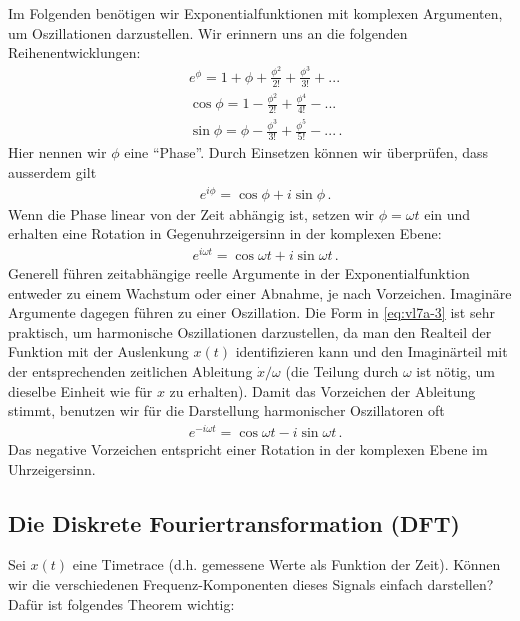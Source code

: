 Im Folgenden benötigen wir Exponentialfunktionen mit komplexen Argumenten, um Oszillationen darzustellen. Wir erinnern uns an die folgenden Reihenentwicklungen:
\begin{align}
&e^{\phi} = 1 + \phi + \frac{\phi^2}{2!} + \frac{\phi^3}{3!} + ... \nonumber\\
&\cos{\phi} = 1 - \frac{\phi^2}{2!} + \frac{\phi^4}{4!} - ...\nonumber\\
&\sin{\phi} = \phi - \frac{\phi^3}{3!} + \frac{\phi^5}{5!} - ...\,.
\label{eq:vl7a-1}
\end{align}
Hier nennen wir $\phi$ eine ``Phase''. Durch Einsetzen können wir überprüfen, dass ausserdem gilt
\begin{align}
&e^{i\phi} = \cos{\phi} +i\sin{\phi}\,.
\label{eq:vl7a-2}
\end{align}
Wenn die Phase linear von der Zeit abhängig ist, setzen wir $\phi = \omega t$ ein und erhalten eine Rotation in Gegenuhrzeigersinn in der komplexen Ebene:
\begin{align}
&e^{i\omega t} = \cos{\omega t} +i\sin{\omega t}\,.
\label{eq:vl7a-3}
\end{align}
Generell führen zeitabhängige reelle Argumente in der Exponentialfunktion entweder zu einem Wachstum oder einer Abnahme, je nach Vorzeichen. Imaginäre Argumente dagegen führen zu einer Oszillation. Die Form in \cref{eq:vl7a-3} ist sehr praktisch, um harmonische Oszillationen darzustellen, da man den Realteil der Funktion mit der Auslenkung $x(t)$ identifizieren kann und den Imaginärteil mit der entsprechenden zeitlichen Ableitung $\dot{x}/\omega$ (die Teilung durch $\omega$ ist nötig, um dieselbe Einheit wie für $x$ zu erhalten). Damit das Vorzeichen der Ableitung stimmt, benutzen wir für die Darstellung harmonischer Oszillatoren oft
\begin{align}
&e^{-i\omega t} = \cos{\omega t} -i\sin{\omega t}\,.
\label{eq:vl7a-4}
\end{align}
Das negative Vorzeichen entspricht einer Rotation in der komplexen Ebene im Uhrzeigersinn.

\subsection{Die Diskrete Fouriertransformation (DFT)}
\label{subsec:vl7}

Sei $x(t)$ eine Timetrace (d.h. gemessene Werte als Funktion der Zeit). 
Können wir die verschiedenen Frequenz-Komponenten dieses Signals einfach darstellen?  
Dafür ist folgendes Theorem wichtig: 

